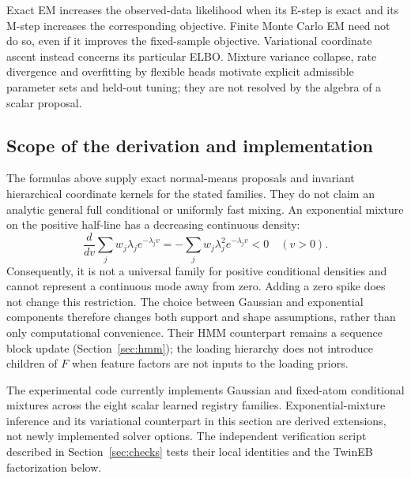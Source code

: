 Exact EM increases the observed-data likelihood when its E-step is exact
and its M-step increases the corresponding objective. Finite Monte Carlo
EM need not do so, even if it improves the fixed-sample objective.
Variational coordinate ascent instead concerns its particular ELBO.
Mixture variance collapse, rate divergence and overfitting by flexible
heads motivate explicit admissible parameter sets and held-out tuning;
they are not resolved by the algebra of a scalar proposal.

\subsection{Scope of the derivation and implementation}
The formulas above supply exact normal-means proposals and invariant
hierarchical coordinate kernels for the stated families. They do not claim
an analytic general full conditional or uniformly fast mixing.
An exponential mixture on the positive half-line has a decreasing
continuous density:
\[
\frac{d}{dv}\sum_jw_j\lambda_je^{-\lambda_jv}
=-\sum_jw_j\lambda_j^2e^{-\lambda_jv}<0\quad(v>0).
\]
Consequently, it is not a universal family for positive conditional
densities and cannot represent a continuous mode away from zero.
Adding a zero spike does not change this restriction. The choice between
Gaussian and exponential components therefore changes both support and
shape assumptions, rather than only computational convenience.
Their HMM counterpart remains a sequence block update
(Section~\ref{sec:hmm}); the loading hierarchy does not introduce children
of \(F\) when feature factors are not inputs to the loading priors.

The experimental code currently implements Gaussian and fixed-atom
conditional mixtures across the eight scalar learned registry families.
Exponential-mixture inference and its variational counterpart in this
section are derived extensions, not newly implemented solver options.
The independent verification script described in Section~\ref{sec:checks}
tests their local identities and the TwinEB factorization below.
